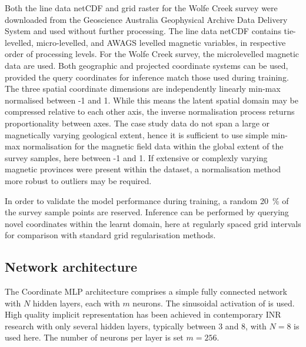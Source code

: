 \documentclass[manuscript.tex]{subfiles}
\begin{document}
Both the line data netCDF and grid raster for the Wolfe Creek survey were downloaded from the Geoscience Australia Geophysical Archive Data Delivery System and used without further processing.
The line data netCDF contains tie-levelled, micro-levelled, and AWAGS levelled magnetic variables, in respective order of processing levels.
For the Wolfe Creek survey, the microlevelled magnetic data are used.
Both geographic and projected coordinate systems can be used, provided the query coordinates for inference match those used during training.
The three spatial coordinate dimensions are independently linearly min-max normalised between -1 and 1.
While this means the latent spatial domain may be compressed relative to each other axis, the inverse normalisation process returns proportionality between axes.
The case study data do not span a large or magnetically varying geological extent, hence it is sufficient to use simple min-max normalisation for the magnetic field data within the global extent of the survey samples, here between -1 and 1.
If extensive or complexly varying magnetic provinces were present within the dataset, a normalisation method more robust to outliers may be required.

In order to validate the model performance during training, a random \qty{20}{\percent} of the survey sample points are reserved.
Inference can be performed by querying novel coordinates within the learnt domain, here at regularly spaced grid intervals for comparison with standard grid regularisation methods.

\subsection{Network architecture}
The Coordinate MLP architecture comprises a simple fully connected network with \(N\) hidden layers, each with \(m\) neurons.
The sinusoidal activation of \cite{sitzmann2019siren} is used. %
High quality implicit representation has been achieved in contemporary INR research with only several hidden layers, typically between 3 and 8, with \(N = 8\) is used here.
The number of neurons per layer is set \(m = 256\).
\end{document}
